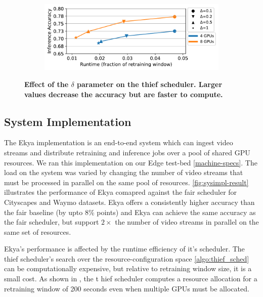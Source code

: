 \begin{figure}
  \centering
  \begin{subfigure}[t]{\linewidth}
    \centering
    \includegraphics[width=\linewidth]{results/sensitivity/sensitivity_delta_acc_runtime_cityscapes_48gpu.pdf}
  \end{subfigure}
  \caption{\small \bf Effect of the $\delta$ parameter on the thief scheduler. Larger values decrease the accuracy but are faster to compute.}
  \label{fig:sensitivity-delta}
\end{figure}

\subsection{System Implementation}
The Ekya implementation is an end-to-end system which can ingest video streams and distribute retraining and inference jobs over a pool of shared GPU resources. We ran this implementation on our Edge test-bed \ref{machine-specs}. The load on the system was varied by changing the number of video streams that must be processed in parallel on the same pool of resources. \cref{fig:sysimpl-result} illustrates the performance of Ekya comapred against the fair scheduler for Cityscapes and Waymo datasets. Ekya offers a consistently higher accuracy than the fair baseline (by upto 8\% points) and Ekya can achieve the same accuracy as the fair scheduler, but support $2\times$ the number of video streams in parallel on the same set of resources.

Ekya's performance is affected by the runtime efficiency of it's scheduler. The thief scheduler's search over the resource-configuration space \ref{algo:thief_sched} can be computationally expensive, but relative to retraining window size, it is a small cost. As shown in , the t  hief scheduler computes a resource allocation for a retraining window of 200 seconds even when multiple GPUs must be allocated.

